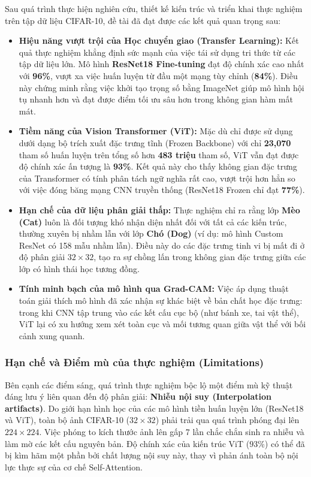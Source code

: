 \documentclass[a4paper]{article}
\theoremstyle{definition}
\begin{document}
Sau quá trình thực hiện nghiên cứu, thiết kế kiến trúc và triển khai thực nghiệm trên tập dữ liệu CIFAR-10, đề tài đã đạt được các kết quả quan trọng sau:

\begin{itemize}
	\item \textbf{Hiệu năng vượt trội của Học chuyển giao (Transfer Learning):} Kết quả thực nghiệm khẳng định sức mạnh của việc tái sử dụng tri thức từ các tập dữ liệu lớn. Mô hình \textbf{ResNet18 Fine-tuning} đạt độ chính xác cao nhất với \textbf{96\%}, vượt xa việc huấn luyện từ đầu một mạng tùy chỉnh (\textbf{84\%}). Điều này chứng minh rằng việc khởi tạo trọng số bằng ImageNet giúp mô hình hội tụ nhanh hơn và đạt được điểm tối ưu sâu hơn trong không gian hàm mất mát.
	\item \textbf{Tiềm năng của Vision Transformer (ViT):} Mặc dù chỉ được sử dụng dưới dạng bộ trích xuất đặc trưng tĩnh (Frozen Backbone) với chỉ \textbf{23,070} tham số huấn luyện trên tổng số hơn \textbf{483 triệu} tham số, ViT vẫn đạt được độ chính xác ấn tượng là \textbf{93\%}. Kết quả này cho thấy không gian đặc trưng của Transformer có tính phân tách ngữ nghĩa rất cao, vượt trội hơn hẳn so với việc đóng băng mạng CNN truyền thống (ResNet18 Frozen chỉ đạt \textbf{77\%}).
	\item \textbf{Hạn chế của dữ liệu phân giải thấp:} Thực nghiệm chỉ ra rằng lớp \textbf{Mèo (Cat)} luôn là đối tượng khó nhận diện nhất đối với tất cả các kiến trúc, thường xuyên bị nhầm lẫn với lớp \textbf{Chó (Dog)} (ví dụ: mô hình Custom ResNet có 158 mẫu nhầm lẫn). Điều này do các đặc trưng tinh vi bị mất đi ở độ phân giải $32 \times 32$, tạo ra sự chồng lấn trong không gian đặc trưng giữa các lớp có hình thái học tương đồng.
	\item \textbf{Tính minh bạch của mô hình qua Grad-CAM:} Việc áp dụng thuật toán giải thích mô hình đã xác nhận sự khác biệt về bản chất học đặc trưng: trong khi CNN tập trung vào các kết cấu cục bộ (như bánh xe, tai vật thể), ViT lại có xu hướng xem xét toàn cục và mối tương quan giữa vật thể với bối cảnh xung quanh.
\end{itemize}

\subsubsection{Hạn chế và Điểm mù của thực nghiệm (Limitations)}
Bên cạnh các điểm sáng, quá trình thực nghiệm bộc lộ một điểm mù kỹ thuật đáng lưu ý liên quan đến độ phân giải: \textbf{Nhiễu nội suy (Interpolation artifacts)}. Do giới hạn hình học của các mô hình tiền huấn luyện lớn (ResNet18 và ViT), toàn bộ ảnh CIFAR-10 ($32 \times 32$) phải trải qua quá trình phóng đại lên $224 \times 224$. Việc phóng to kích thước ảnh lên gấp 7 lần chắc chắn sinh ra nhiễu và làm mờ các kết cấu nguyên bản. Độ chính xác của kiến trúc ViT ($93\%$) có thể đã bị kìm hãm một phần bởi chất lượng nội suy này, thay vì phản ánh toàn bộ nội lực thực sự của cơ chế Self-Attention.
\end{document}
